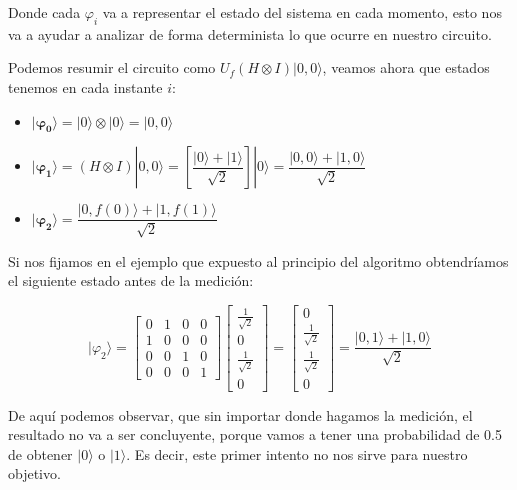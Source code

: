 \vspace{30pt}

Donde cada $\varphi_{i}$ va a representar el estado del sistema en cada momento, esto nos va a ayudar a analizar de forma determinista lo que ocurre en nuestro circuito.\newline

Podemos resumir el circuito como $U_{f}(H\otimes I)|0,0\rangle$, veamos ahora que estados tenemos en cada instante $i$:

\begin{itemize}
    \item $\mathbf{|\varphi_{0}\rangle} = |0\rangle \otimes |0\rangle = |0,0\rangle$

    \item $\mathbf{|\varphi_{1}\rangle} = (H\otimes I)|0,0\rangle = \left[ \dfrac{|0\rangle + |1\rangle}{\sqrt{2}}\right] |0\rangle = \dfrac{|0,0\rangle+|1,0\rangle}{\sqrt{2}}$

    \item  $\mathbf{|\varphi_{2}\rangle} = \dfrac{|0,f(0)\rangle+|1,f(1)\rangle}{\sqrt{2}}$
\end{itemize}

Si nos fijamos en el ejemplo que expuesto al principio del algoritmo obtendríamos el siguiente estado antes de la medición:

\begin{equation}
    |\varphi_{2}\rangle=\begin{bmatrix}
        0 & 1 & 0 & 0 \\
        1 & 0 & 0 & 0 \\
        0 & 0 & 1 & 0 \\
        0 & 0 & 0 & 1
    \end{bmatrix}
    \begin{bmatrix}
        \frac{1}{\sqrt{2}} \\ 0 \\ \frac{1}{\sqrt{2}} \\ 0 
    \end{bmatrix} = 
    \begin{bmatrix}
        0 \\ \frac{1}{\sqrt{2}} \\ \frac{1}{\sqrt{2}} \\ 0 
    \end{bmatrix} = \dfrac{|0,1\rangle + |1,0\rangle}{\sqrt{2}}
\end{equation}

De aquí podemos observar, que sin importar donde hagamos la medición, el resultado no va a ser concluyente, porque vamos a tener una probabilidad de 0.5 de obtener $|0\rangle$ o $|1\rangle$. Es decir, este primer intento no nos sirve para nuestro objetivo. \newline


